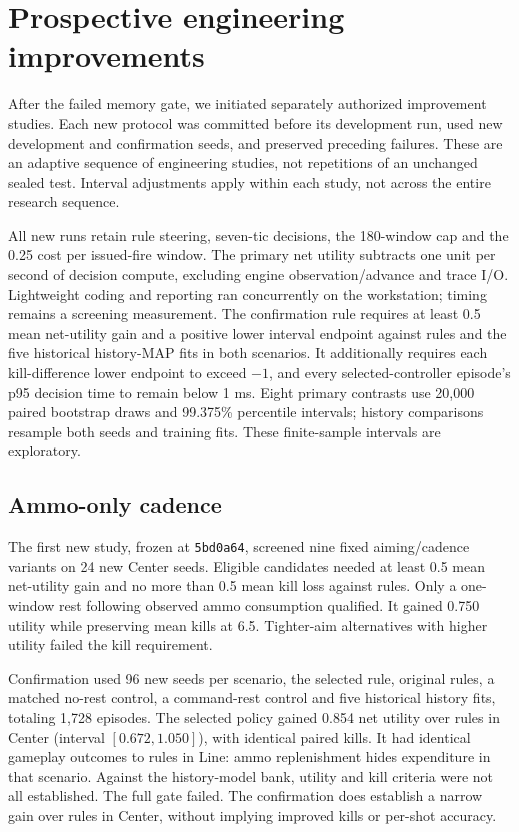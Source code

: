 \section{Prospective engineering improvements}
After the failed memory gate, we initiated separately authorized improvement studies. Each new protocol was committed before its development run, used new development and confirmation seeds, and preserved preceding failures. These are an adaptive sequence of engineering studies, not repetitions of an unchanged sealed test. Interval adjustments apply within each study, not across the entire research sequence.

All new runs retain rule steering, seven-tic decisions, the 180-window cap and the 0.25 cost per issued-fire window. The primary net utility subtracts one unit per second of decision compute, excluding engine observation/advance and trace I/O. Lightweight coding and reporting ran concurrently on the workstation; timing remains a screening measurement. The confirmation rule requires at least 0.5 mean net-utility gain and a positive lower interval endpoint against rules and the five historical history-MAP fits in both scenarios. It additionally requires each kill-difference lower endpoint to exceed $-1$, and every selected-controller episode's p95 decision time to remain below 1 ms. Eight primary contrasts use 20,000 paired bootstrap draws and 99.375\% percentile intervals; history comparisons resample both seeds and training fits. These finite-sample intervals are exploratory.

\subsection{Ammo-only cadence}
The first new study, frozen at \texttt{5bd0a64}, screened nine fixed aiming/cadence variants on 24 new Center seeds. Eligible candidates needed at least 0.5 mean net-utility gain and no more than 0.5 mean kill loss against rules. Only a one-window rest following observed ammo consumption qualified. It gained 0.750 utility while preserving mean kills at 6.5. Tighter-aim alternatives with higher utility failed the kill requirement.

Confirmation used 96 new seeds per scenario, the selected rule, original rules, a matched no-rest control, a command-rest control and five historical history fits, totaling 1,728 episodes. The selected policy gained 0.854 net utility over rules in Center (interval $[0.672,1.050]$), with identical paired kills. It had identical gameplay outcomes to rules in Line: ammo replenishment hides expenditure in that scenario. Against the history-model bank, utility and kill criteria were not all established. The full gate failed. The confirmation does establish a narrow gain over rules in Center, without implying improved kills or per-shot accuracy.

